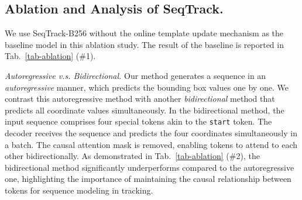 \subsection{Ablation and Analysis of SeqTrack. }
\label{subsec:ablation}

We use SeqTrack-B256 without the online template update mechanism as the baseline model in this ablation study. The result of the baseline is reported in Tab.~\ref{tab-ablation} (\#1).

\textit{Autoregressive v.s. Bidirectional.} Our method generates a sequence in an \emph{autoregressive} manner, which predicts the bounding box values one by one. We contrast this autoregressive method with another \emph{bidirectional} method that predicts all coordinate values simultaneously. In the bidirectional method, the input sequence comprises four special tokens akin to the \texttt{start} token. The decoder receives the sequence and predicts the four coordinates simultaneously in a batch. The causal attention mask is removed, enabling tokens to attend to each other bidirectionally. As demonstrated in Tab.~\ref{tab-ablation} (\#2), the bidirectional method significantly underperforms compared to the autoregressive one, highlighting the importance of maintaining the causal relationship between tokens for sequence modeling in tracking.


